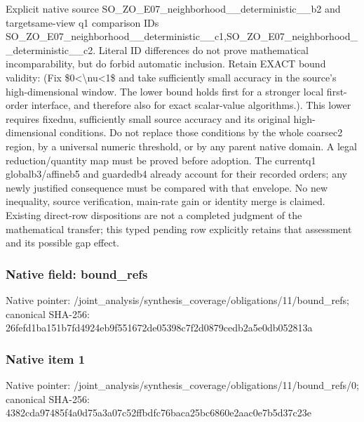 \documentclass[10pt,a4paper]{article}
\begin{document}
\begingroup\raggedright\sloppy Explicit native source SO\_\allowbreak{}ZO\_\allowbreak{}E07\_\allowbreak{}neighborhood\_\allowbreak{}\_\allowbreak{}deterministic\_\allowbreak{}\_\allowbreak{}b2 and targetsame-view q1 comparison IDs SO\_\allowbreak{}ZO\_\allowbreak{}E07\_\allowbreak{}neighborhood\_\allowbreak{}\_\allowbreak{}deterministic\_\allowbreak{}\_\allowbreak{}c1,\allowbreak{}SO\_\allowbreak{}ZO\_\allowbreak{}E07\_\allowbreak{}neighborhood\_\allowbreak{}\_\allowbreak{}deterministic\_\allowbreak{}\_\allowbreak{}c2. Literal ID differences do not prove mathematical incomparability,\allowbreak{} but do forbid automatic inclusion. Retain EXACT bound validity:\allowbreak{} (Fix \$0<\textbackslash{}nu<1\$ and take sufficiently small accuracy in the source's high-dimensional window. The lower bound holds first for a stronger local first-order interface,\allowbreak{} and therefore also for exact scalar-value algorithms.). This lower requires fixednu,\allowbreak{} sufficiently small source accuracy and its original high-dimensional conditions. Do not replace those conditions by the whole coarsec2 region,\allowbreak{} by a universal numeric threshold,\allowbreak{} or by any parent native domain. A legal reduction/\allowbreak{}quantity map must be proved before adoption. The currentq1 globalb3/\allowbreak{}affineb5 and guardedb4 already account for their recorded orders;\allowbreak{} any newly justified consequence must be compared with that envelope. No new inequality,\allowbreak{} source verification,\allowbreak{} main-rate gain or identity merge is claimed. Existing direct-row dispositions are not a completed judgment of the mathematical transfer;\allowbreak{} this typed pending row explicitly retains that assessment and its possible gap effect.\par\endgroup

\subsubsection{Native field: bound\_\allowbreak{}refs}
Native pointer: /joint\_\allowbreak{}analysis/synthesis\_\allowbreak{}coverage/obligations/11/bound\_\allowbreak{}refs; canonical SHA-256: 26fefd1ba151b7fd4924eb9f551672de05398c7f2d0879cedb2a5e0db052813a

\subsubsection{Native item 1}
Native pointer: /joint\_\allowbreak{}analysis/synthesis\_\allowbreak{}coverage/obligations/11/bound\_\allowbreak{}refs/0; canonical SHA-256: 4382cda97485f4a0d75a3a07c52ffbdfc76baca25bc6860e2aac0e7b5d37c23e
\end{document}
